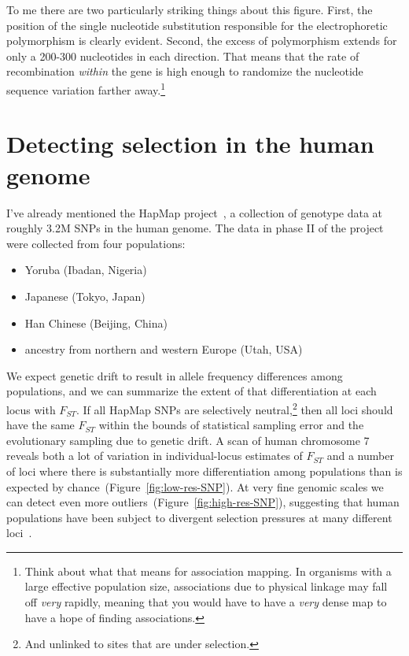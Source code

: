 To me there are two particularly striking things about this
figure. First, the position of the single nucleotide substitution
responsible for the electrophoretic polymorphism is clearly
evident. Second, the excess of polymorphism extends for only a 200-300
nucleotides in each direction. That means that the rate of
recombination {\it within\/} the gene is high enough to randomize the
nucleotide sequence variation farther away.\footnote{Think about what
  that means for association mapping. In organisms with a large
  effective population size, associations due to physical linkage may
  fall off {\it very\/} rapidly, meaning that you would have to have a
  {\it very\/} dense map to have a hope of finding associations.}

\section*{Detecting selection in the human genome}

I've already mentioned the HapMap project~\cite{HapMap-2007}, a
collection of genotype data at roughly 3.2M SNPs in the human
genome. The data in phase II of the project were collected from four
populations:

\begin{itemize}

\item Yoruba (Ibadan, Nigeria)

\item Japanese (Tokyo, Japan)

\item Han Chinese (Beijing, China)

\item ancestry from northern and western Europe (Utah, USA)

\end{itemize}

We expect genetic drift to result in allele frequency differences
among populations, and we can summarize the extent of that
differentiation at each locus with $F_{ST}$. If all HapMap SNPs are
selectively neutral,\footnote{And unlinked to sites that are under
  selection.} then all loci should have the same $F_{ST}$ within the
bounds of statistical sampling error and the evolutionary sampling due
to genetic drift. A scan of human chromosome 7 reveals both a lot of
variation in individual-locus estimates of $F_{ST}$ and a number of
loci where there is substantially more differentiation among
populations than is expected by
chance~(Figure~\ref{fig:low-res-SNP}). At very fine genomic scales we
can detect even more outliers~(Figure~\ref{fig:high-res-SNP}),
suggesting that human populations have been subject to divergent
selection pressures at many different loci~\cite{Guo-etal-2009}.

